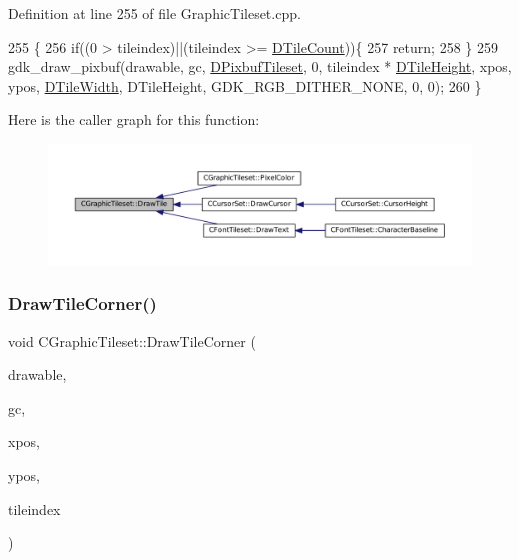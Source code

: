 Definition at line 255 of file Graphic\+Tileset.\+cpp.


\begin{DoxyCode}
255                                                                                                    \{
256     \textcolor{keywordflow}{if}((0 > tileindex)||(tileindex >= \hyperlink{classCGraphicTileset_a39d942b370e47f441bf97385eb1037c8}{DTileCount}))\{
257         \textcolor{keywordflow}{return};
258     \}
259     gdk\_draw\_pixbuf(drawable, gc, \hyperlink{classCGraphicTileset_a5d5adfcdbb347a6df3f57535ca08e3ef}{DPixbufTileset}, 0, tileindex * 
      \hyperlink{classCGraphicTileset_af48f32e07d5fe69afd5f764318cc3244}{DTileHeight}, xpos, ypos, \hyperlink{classCGraphicTileset_a2d0c7d19865b81911a3a43d5cae50e00}{DTileWidth}, DTileHeight, GDK\_RGB\_DITHER\_NONE, 0, 0);
260 \}
\end{DoxyCode}
Here is the caller graph for this function\+:\nopagebreak
\begin{figure}[H]
\begin{center}
\leavevmode
\includegraphics[width=350pt]{classCGraphicTileset_afefd501a74e95295b7cd2dc868dcbbcb_icgraph}
\end{center}
\end{figure}
\hypertarget{classCGraphicTileset_abf87dd71c8bf50b8878c66a5bdb2c7e7}{}\label{classCGraphicTileset_abf87dd71c8bf50b8878c66a5bdb2c7e7} 
\subsubsection{\texorpdfstring{Draw\+Tile\+Corner()}{DrawTileCorner()}}
{\footnotesize\ttfamily void C\+Graphic\+Tileset\+::\+Draw\+Tile\+Corner (\begin{DoxyParamCaption}\item[{Gdk\+Drawable $\ast$}]{drawable,  }\item[{Gdk\+GC $\ast$}]{gc,  }\item[{gint}]{xpos,  }\item[{gint}]{ypos,  }\item[{int}]{tileindex }\end{DoxyParamCaption})}



